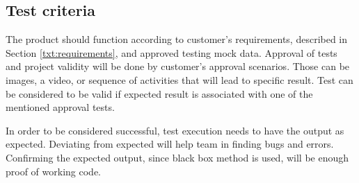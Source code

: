\subsection{Test criteria} 

The product should function according to customer's requirements, described in Section \ref{txt:requirements}, and approved testing mock data.
Approval of tests and project validity will be done by customer's approval scenarios. 
Those can be images, a video, or sequence of activities that will lead to specific result. 
Test can be considered to be valid if expected result is associated with one of the mentioned approval tests.

In order to be considered successful, test execution needs to have the output as expected. 
Deviating from expected will help team in finding bugs and errors.
Confirming the expected output, since black box method is used, will be enough proof of working code.
